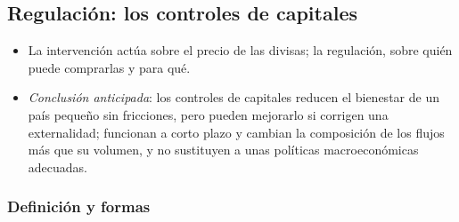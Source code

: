 \documentclass[11pt]{article}
\begin{document}
\subsection{Regulación: los controles de capitales}\label{sec:regulacion}

\begin{itemize}
\item La intervención actúa sobre el precio de las divisas; la regulación, sobre quién puede comprarlas y para qué.
\item \emph{Conclusión anticipada}: los controles de capitales reducen el bienestar de un país pequeño sin fricciones, pero pueden mejorarlo si corrigen una externalidad; funcionan a corto plazo y cambian la composición de los flujos más que su volumen, y no sustituyen a unas políticas macroeconómicas adecuadas.
\end{itemize}

\subsubsection{Definición y formas}\label{sec:controles-formas}
\end{document}
